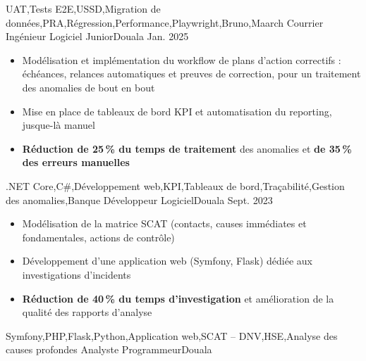 \begin{experiences}
{\begin{itemize}
                      \end{itemize}
                    }
                    {UAT,Tests E2E,USSD,Migration de données,PRA,Régression,Performance,Playwright,Bruno,Maarch Courrier}
  \emptySeparator
     {Ingénieur Logiciel Junior}{}{Douala}
    {Jan. 2025} {
                      \begin{itemize}
                        \item Modélisation et implémentation du workflow de plans d'action correctifs : échéances, relances automatiques et preuves de correction, pour un traitement des anomalies de bout en bout
                        \item Mise en place de tableaux de bord KPI et automatisation du reporting, jusque-là manuel
                        \item \textbf{Réduction de 25\,\% du temps de traitement} des anomalies et \textbf{de 35\,\% des erreurs manuelles}
                      \end{itemize}
                    }
                    {.NET Core,C\#,Développement web,KPI,Tableaux de bord,Traçabilité,Gestion des anomalies,Banque}
  \emptySeparator
     {Développeur Logiciel}{}{Douala}
    {Sept. 2023} {
                      \begin{itemize}
                        \item Modélisation de la matrice SCAT (contacts, causes immédiates et fondamentales, actions de contrôle)
                        \item Développement d'une application web (Symfony, Flask) dédiée aux investigations d'incidents
                        \item \textbf{Réduction de 40\,\% du temps d'investigation} et amélioration de la qualité des rapports d'analyse
                      \end{itemize}
                    }
                    {Symfony,PHP,Flask,Python,Application web,SCAT -- DNV,HSE,Analyse des causes profondes}
  \emptySeparator
     {Analyste Programmeur}{}{Douala}

\end{experiences}
